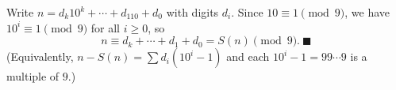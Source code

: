 Write $n=d_k10^k+\cdots+d_110+d_0$ with digits $d_i$. Since $10\equiv1\pmod9$, we have $10^i\equiv1\pmod9$ for all $i\ge0$, so
\[n\equiv d_k+\cdots+d_1+d_0=S(n)\pmod9.\ \blacksquare\]
(Equivalently, $n-S(n)=\sum d_i\left(10^i-1\right)$ and each $10^i-1=99\cdots9$ is a multiple of $9$.)

